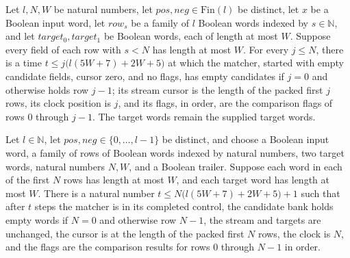 \begin{lemma}
\label{Complexity.clMatch_prefix}
\leanok
{}
Let $l,N,W$ be natural numbers, let $pos,neg\in\text{Fin}(l)$ be distinct, let $x$ be a
Boolean input word, let $row_s$ be a family of $l$ Boolean words indexed by
$s\in\mathbb{N}$, and let $target_0,target_1$ be Boolean words, each of length at most
$W$. Suppose every field of each row with $s<N$ has length at most $W$. For every $j\le
N$, there is a time $t\le j\bigl(l(5W+7)+2W+5\bigr)$ at which the matcher, started with
empty candidate fields, cursor zero, and no flags, has empty candidates if $j=0$ and
otherwise holds row $j-1$; its stream cursor is the length of the packed first $j$ rows,
its clock position is $j$, and its flags, in order, are the comparison flags of rows $0$
through $j-1$. The target words remain the supplied target words.
\end{lemma}

\begin{lemma}
\label{Complexity.clMatch_complete}
\leanok
{}
Let $l\in\mathbb{N}$, let $pos,neg\in\{0,\ldots,l-1\}$ be distinct, and choose a Boolean
input word, a family of rows of Boolean words indexed by natural numbers, two target
words, natural numbers $N,W$, and a Boolean trailer. Suppose each word in each of the
first $N$ rows has length at most $W$, and each target word has length at most $W$.
There is a natural number $t\le N\bigl(l(5W+7)+2W+5\bigr)+1$ such that after $t$ steps
the matcher is in its completed control, the candidate bank holds empty words if $N=0$
and otherwise row $N-1$, the stream and targets are unchanged, the cursor is at the
length of the packed first $N$ rows, the clock is $N$, and the flags are the comparison
results for rows $0$ through $N-1$ in order.
\end{lemma}

